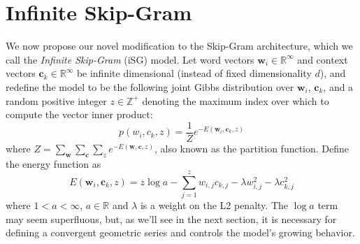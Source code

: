 \documentclass{article} %
\begin{document}
\section{Infinite Skip-Gram}\label{isgm_sec}
We now propose our novel modification to the Skip-Gram architecture, which we call the \textit{Infinite Skip-Gram} (iSG) model.  Let word vectors $\mathbf{w}_{i} \in \mathbb{R}^{\infty}$ and context vectors $\mathbf{c}_{k} \in \mathbb{R}^{\infty}$ be infinite dimensional (instead of fixed dimensionality $d$), and redefine the model to be the following joint Gibbs distribution over $\mathbf{w}_{i}$, $\mathbf{c}_{k}$, and a random positive integer $z \in \mathbb{Z}^{+}$ denoting the maximum index over which to compute the vector inner product: \begin{equation}
p(w_{i}, c_{k}, z) = \frac{1}{Z} e^{-E(\mathbf{w}_{i}, \mathbf{c}_{k}, z)} 
\end{equation} where $Z = \sum_{\mathbf{w}} \sum_{\mathbf{c}} \sum_{z} e^{-E(\mathbf{w}, \mathbf{c}, z)}$, also known as the partition function.  Define the energy function as \begin{equation}
E(\mathbf{w}_{i}, \mathbf{c}_{k}, z) = z\log a - \sum_{j=1}^{z} w_{i,j}c_{k,j} - \lambda w_{i,j}^{2} - \lambda c_{k,j}^{2} 
\end{equation} where $1 < a < \infty$, $a \in \mathbb{R}$ and $\lambda$ is a weight on the L2 penalty.  The $\log a$ term may seem superfluous, but, as we'll see in the next section, it is necessary for defining a convergent geometric series and controls the model's growing behavior.  
\end{document}
